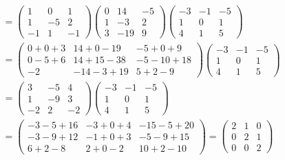 \begin{loesung}
\begin{align*}
\\
&=
\begin{pmatrix}
   1&  0&  1\\
   1& -5&  2\\
  -1&  1& -1
\end{pmatrix}
\begin{pmatrix}
    0&  14&  -5\\
    1&  -3&   2\\
    3& -19&   9
\end{pmatrix}
\begin{pmatrix}
  -3& -1& -5\\
   1&  0&  1\\
   4&  1&  5
\end{pmatrix}
\\
&=
\begin{pmatrix}
   0+0+3&14+0-19& -5+0+9\\
   0-5+6&14+15-38&-5-10+18\\
-2&-14-3+19&5+2-9
\end{pmatrix}
\begin{pmatrix}
  -3& -1& -5\\
   1&  0&  1\\
   4&  1&  5
\end{pmatrix}
\\
&=
\begin{pmatrix}
   3& -5&  4\\
   1& -9&  3\\
  -2&  2& -2
\end{pmatrix}
\begin{pmatrix}
  -3& -1& -5\\
   1&  0&  1\\
   4&  1&  5
\end{pmatrix}
\\
&=
\begin{pmatrix}
-3-5+16&-3+0+4&-15-5+20\\
-3-9+12&-1+0+3&-5-9+15\\
6+2-8&2+0-2&10+2-10
\end{pmatrix}
=
\begin{pmatrix}
2&1&0\\
0&2&1\\
0&0&2
\end{pmatrix}
\end{align*}
\end{loesung}

